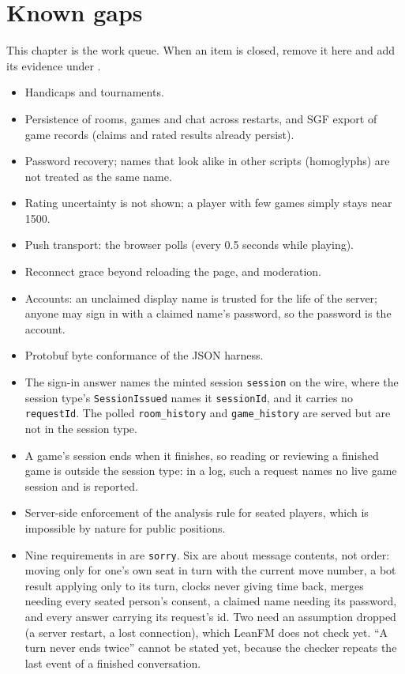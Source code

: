 \documentclass[11pt,oneside]{book}
\begin{document}
\chapter{Known gaps}
\label{ch:gaps}
This chapter is the work queue. When an item is closed, remove it here and add
its evidence under .
\begin{itemize}
  \item Handicaps and tournaments.
  \item Persistence of rooms, games and chat across restarts, and SGF export of
  game records (claims and rated results already persist).
  \item Password recovery; names that look alike in other scripts (homoglyphs)
  are not treated as the same name.
  \item Rating uncertainty is not shown; a player with few games simply stays
  near 1500.
  \item Push transport: the browser polls (every 0.5 seconds while playing).
  \item Reconnect grace beyond reloading the page, and moderation.
  \item Accounts: an unclaimed display name is trusted for the life of the
  server; anyone may sign in with a claimed name's password, so the password is
  the account.
  \item Protobuf byte conformance of the JSON harness.
  \item The sign-in answer names the minted session \texttt{session} on the
  wire, where the session type's \texttt{SessionIssued} names it
  \texttt{sessionId}, and it carries no \texttt{requestId}. The polled
  \texttt{room\_history} and \texttt{game\_history} are served but are not in
  the session type.
  \item A game's session ends when it finishes, so reading or reviewing a
  finished game is outside the session type: in a log, such a request names no
  live game session and is reported.
  \item Server-side enforcement of the analysis rule for seated players, which
  is impossible by nature for public positions.
  \item Nine requirements in  are \texttt{sorry}.
  Six are about message contents, not order: moving only for one's own seat
  in turn with the current move number, a bot result applying only to its
  turn, clocks never giving time back, merges needing every seated person's
  consent, a claimed name needing its password, and every answer carrying its
  request's id. Two need an assumption dropped (a server restart, a lost
  connection), which LeanFM does not check yet. ``A turn never ends twice''
  cannot be stated yet, because the checker repeats the last event of a
  finished conversation.
\end{itemize}
\end{document}

